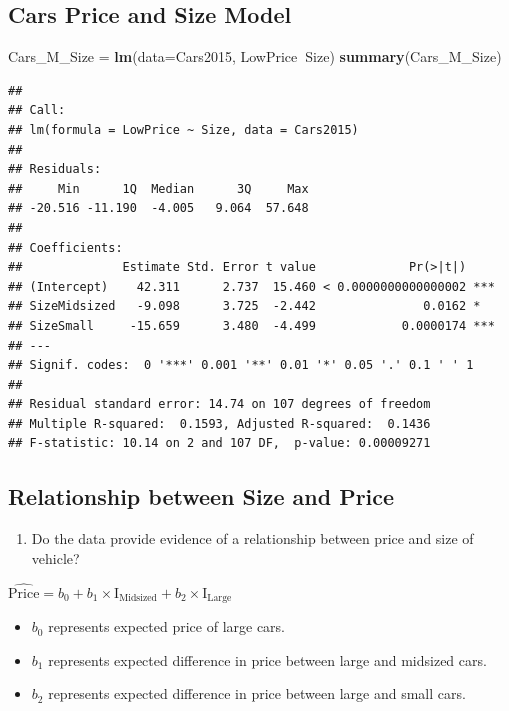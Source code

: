 \documentclass[]{book}
\newenvironment{Shaded}{\begin{snugshade}}{\end{snugshade}}
\newcommand{\KeywordTok}[1]{\textcolor[rgb]{0.13,0.29,0.53}{\textbf{#1}}}
\newcommand{\DataTypeTok}[1]{\textcolor[rgb]{0.13,0.29,0.53}{#1}}
\newcommand{\StringTok}[1]{\textcolor[rgb]{0.31,0.60,0.02}{#1}}
\newcommand{\OperatorTok}[1]{\textcolor[rgb]{0.81,0.36,0.00}{\textbf{#1}}}
\newcommand{\NormalTok}[1]{#1}
\providecommand{\tightlist}{%
  \setlength{\itemsep}{0pt}\setlength{\parskip}{0pt}}
\begin{document}
\subsection{Cars Price and Size Model}\label{cars-price-and-size-model}

\begin{Shaded}
\begin{Highlighting}[]
\NormalTok{Cars_M_Size =}\StringTok{ }\KeywordTok{lm}\NormalTok{(}\DataTypeTok{data=}\NormalTok{Cars2015, LowPrice}\OperatorTok{~}\NormalTok{Size)}
\KeywordTok{summary}\NormalTok{(Cars_M_Size)}
\end{Highlighting}
\end{Shaded}

\begin{verbatim}
## 
## Call:
## lm(formula = LowPrice ~ Size, data = Cars2015)
## 
## Residuals:
##     Min      1Q  Median      3Q     Max 
## -20.516 -11.190  -4.005   9.064  57.648 
## 
## Coefficients:
##              Estimate Std. Error t value             Pr(>|t|)    
## (Intercept)    42.311      2.737  15.460 < 0.0000000000000002 ***
## SizeMidsized   -9.098      3.725  -2.442               0.0162 *  
## SizeSmall     -15.659      3.480  -4.499            0.0000174 ***
## ---
## Signif. codes:  0 '***' 0.001 '**' 0.01 '*' 0.05 '.' 0.1 ' ' 1
## 
## Residual standard error: 14.74 on 107 degrees of freedom
## Multiple R-squared:  0.1593, Adjusted R-squared:  0.1436 
## F-statistic: 10.14 on 2 and 107 DF,  p-value: 0.00009271
\end{verbatim}

\subsection{Relationship between Size and
Price}\label{relationship-between-size-and-price}

\begin{enumerate}
\def\labelenumi{\arabic{enumi}.}
\tightlist
\item
  Do the data provide evidence of a relationship between price and size
  of vehicle?
\end{enumerate}

\(\widehat{\text{Price}} = b_0 +b_1\times\text{I}_{\text{Midsized}}+ b_2\times\text{I}_{\text{Large}}\)

\begin{itemize}
\tightlist
\item
  \(b_0\) represents expected price of large cars.\\
\item
  \(b_1\) represents expected difference in price between large and
  midsized cars.\\
\item
  \(b_2\) represents expected difference in price between large and
  small cars.
\end{itemize}
\end{document}
